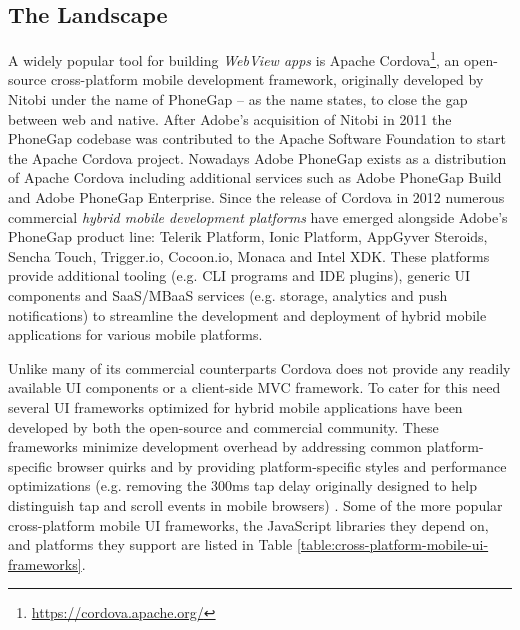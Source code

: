 \documentclass[thesis.tex]{subfiles}
\begin{document}
\subsection{The Landscape}

A widely popular tool for building \textit{WebView apps} is Apache Cordova\footnote{\url{https://cordova.apache.org/}}, an open-source cross-platform mobile development framework, originally developed by Nitobi under the name of PhoneGap -- as the name states, to close the gap between web and native. After Adobe's acquisition of Nitobi in 2011 the PhoneGap codebase was contributed to the Apache Software Foundation to start the Apache Cordova project. Nowadays Adobe PhoneGap exists as a distribution of Apache Cordova including additional services such as Adobe PhoneGap Build and Adobe PhoneGap Enterprise. Since the release of Cordova in 2012 numerous commercial \textit{hybrid mobile development platforms} have emerged alongside Adobe's PhoneGap product line:  Telerik Platform, Ionic Platform, AppGyver Steroids, Sencha Touch, Trigger.io, Cocoon.io, Monaca and Intel XDK. These platforms provide additional tooling (e.g. CLI programs and IDE plugins), generic UI components and SaaS/MBaaS services (e.g. storage, analytics and push notifications) to streamline the development and deployment of hybrid mobile applications for various mobile platforms.

Unlike many of its commercial counterparts Cordova does not provide any readily available UI components or a client-side MVC framework. To cater for this need several UI frameworks optimized for hybrid mobile applications have been developed by both the open-source and commercial community. These frameworks minimize development overhead by addressing common platform-specific browser quirks and by providing platform-specific styles and performance optimizations (e.g. removing the 300ms tap delay originally designed to help distinguish tap and scroll events in mobile browsers) \cite{click_delay}. Some of the more popular cross-platform mobile UI frameworks, the JavaScript libraries they depend on, and platforms they support are listed in Table \ref{table:cross-platform-mobile-ui-frameworks}.
\end{document}
